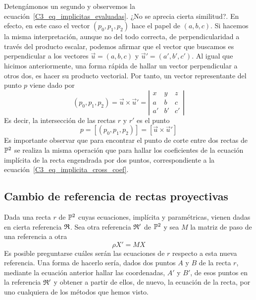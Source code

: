 Detengámonos un segundo y observemos la ecuación~\eqref{C3_eq_implicitas_evaluadas}. ¿No se aprecia cierta similitud?. En efecto, en este caso el vector $(p_0,p_1,p_2)$ hace el papel de $(a,b,c)$. Si hacemos la misma interpretación, aunque no del todo correcta, de perpendicularidad a través del producto escalar, podemos afirmar que el vector que buscamos es perpendicular a los vectores $\vec{u}=(a,b,c)$ y $\vec{u}'=(a',b',c')$. Al igual que hicimos anteriormente, una forma rápida de hallar un vector perpendicular a otros dos, es hacer su producto vectorial. Por tanto, un vector representante del punto $p$ viene dado por
\begin{equation*}
	(p_0,p_1,p_2)=\vec{u}\times \vec{u}'=\left| \begin{array}{ccc}
		x & y & z\\
		a & b & c\\
		a' & b' & c'
	\end{array}\right| 
\end{equation*}
Es decir, la intersección de las rectas $r$ y $r'$ es el punto 
\begin{equation}
	p=[(p_0,p_1,p_2)]=[\vec{u}\times \vec{u}']
\end{equation}
Es importante observar que para encontrar el punto de corte entre dos rectas de $\mathbb{P}^2$ se realiza la misma operación que para hallar los coeficientes de la ecuación implícita de la recta engendrada por dos puntos, correspondiente a la ecuación~\eqref{C3_eq_implicita_cross_coef}. 

\subsection{Cambio de referencia de rectas proyectivas}
Dada una recta $r$ de $\mathbb{P}^2$ cuyas ecuaciones, implícita y paramétricas, vienen dadas en cierta referencia $\mathfrak{R}$. Sea otra referencia $\mathfrak{R}'$ de $\mathbb{P}^2$ y sea $M$ la matriz de paso de una referencia a otra
\begin{equation*}
	\rho X'=MX
\end{equation*}
Es posible preguntarse cuáles serán las ecuaciones de $r$ respecto a esta nueva referencia. Una forma de hacerlo sería, dados dos puntos $A$ y $B$ de la recta $r$, mediante la ecuación anterior hallar las coordenadas, $A'$ y $B'$, de esos puntos en la referencia $\mathfrak{R}'$ y obtener a partir de ellos, de nuevo, la ecuación de la recta, por uno cualquiera de los métodos que hemos visto.\\

